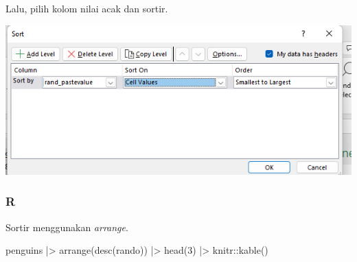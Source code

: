 \documentclass[
  letterpaper,
  DIV=11,
  numbers=noendperiod]{scrreprt}
\newenvironment{Shaded}{\begin{snugshade}}{\end{snugshade}}
\newcommand{\DecValTok}[1]{\textcolor[rgb]{0.68,0.00,0.00}{#1}}
\newcommand{\FunctionTok}[1]{\textcolor[rgb]{0.28,0.35,0.67}{#1}}
\newcommand{\NormalTok}[1]{\textcolor[rgb]{0.00,0.23,0.31}{#1}}
\newcommand{\SpecialCharTok}[1]{\textcolor[rgb]{0.37,0.37,0.37}{#1}}
\begin{document}
Lalu, pilih kolom nilai acak dan sortir.

\includegraphics{./step2-sort22.png}

\hypertarget{r-3}{%
\subsubsection{R}\label{r-3}}

Sortir menggunakan \emph{arrange}.

\begin{Shaded}
\begin{Highlighting}[]
\NormalTok{penguins }\SpecialCharTok{|\textgreater{}} \FunctionTok{arrange}\NormalTok{(}\FunctionTok{desc}\NormalTok{(rando)) }\SpecialCharTok{|\textgreater{}}
  \FunctionTok{head}\NormalTok{(}\DecValTok{3}\NormalTok{) }\SpecialCharTok{|\textgreater{}}\NormalTok{ knitr}\SpecialCharTok{::}\FunctionTok{kable}\NormalTok{()}
\end{Highlighting}
\end{Shaded}
\end{document}
